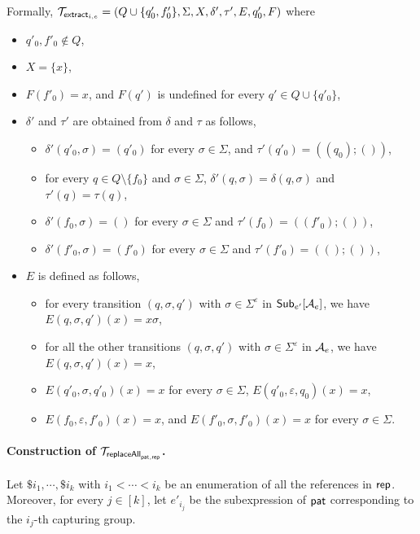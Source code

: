 Formally, $\mathcal{T}_{\mathsf{extract}_{i,e}} = (Q \cup \{q'_0, f'_0\}, \Sigma, X, \delta', \tau', E, q'_0, F)$ where 
\begin{itemize}
\item $q'_0, f'_0 \not \in Q$,

\item  $X = \{x\}$,
%
\item $F(f'_0) = x$, and $F(q')$ is undefined for every $q' \in Q \cup \{q'_0\}$,

\item $\delta'$ and $\tau'$ are obtained from $\delta$ and $\tau$ as follows,
\begin{itemize}
\item $\delta'(q'_0, \sigma) = (q'_0)$ for every $\sigma \in \Sigma$, and $\tau'(q'_0) = ((q_0); ())$,
%
\item  for every $q \in Q \setminus \{f_0\}$ and $\sigma \in \Sigma$, $\delta'(q, \sigma) = \delta(q, \sigma)$ and $\tau'(q) = \tau(q)$, 
%
\item $\delta'(f_0, \sigma) = ()$ for every $\sigma \in \Sigma$ and $\tau'(f_0) = ((f'_0); ())$,
%
\item $\delta'(f'_0, \sigma) = (f'_0)$ for every $\sigma \in \Sigma$ and $\tau'(f'_0) = ((); ())$,
\end{itemize}
%
\item $E$ is defined as follows, 
\begin{itemize}
\item for every transition $(q, \sigma, q')$ with  $\sigma \in \Sigma^\varepsilon$ in ${\sf Sub}_{e'}[\mathcal{A}_e]$, we have $E(q, \sigma, q')(x) = x\sigma$, 
\item for all the other transitions $(q, \sigma, q')$ with $\sigma \in \Sigma^\varepsilon$ in $\mathcal{A}_e$, we have $E(q, \sigma, q')(x) = x$, 
\item $E(q'_0, \sigma, q'_0)(x) = x$ for every $\sigma \in \Sigma$, $E(q'_0, \varepsilon, q_0)(x) = x$, 
\item $E(f_0, \varepsilon, f'_0)(x) = x$, and $E(f'_0, \sigma, f'_0)(x) = x$ for every $\sigma \in \Sigma$.
\end{itemize}
%
\end{itemize}


\paragraph*{Construction of $\mathcal{T}_{\mathsf{replaceAll}_{\mathsf{pat}, \mathsf{rep}}}$.} 
Let $\$i_1, \cdots, \$i_k$ with $i_1 < \cdots < i_k$ be an enumeration of all the references in $\mathsf{rep}$. 
Moreover, for every $j \in [k]$, let $e'_{i_j}$ be the subexpression of $\mathsf{pat}$ corresponding to the $i_j$-th capturing group.


